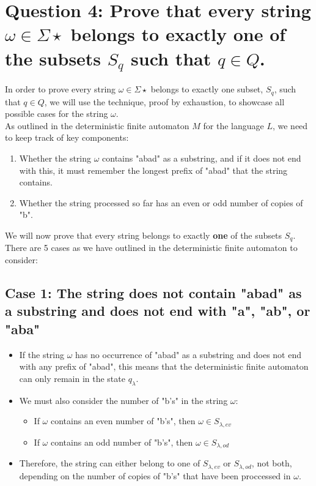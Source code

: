 \documentclass{article}
\begin{document}
\newpage

\section*{Question 4: Prove that every string $\omega \in \Sigma \star$ belongs to exactly one of the subsets $S_q$ such that $q \in Q$.}

In order to prove every string $\omega \in \Sigma \star$ belongs to exactly one subset, $S_q$, such that $q \in Q$, we will use the technique, proof by exhaustion, to showcase all possible
cases for the string $\omega$. \\
As outlined in the deterministic finite automaton $M$ for the language $L$, we need to keep track of key components:
\begin{enumerate}
    \item Whether the string $\omega$ contains "abad" as a substring, and if it does not end with this, it must remember the longest prefix of "abad" that the string contains.
    \item Whether the string processed so far has an even or odd number of copies of "b".
\end{enumerate}
We will now prove that every string belongs to exactly \textbf{one} of the subsets $S_q$. There are 5 cases as we have outlined in the deterministic finite automaton to consider:

\subsection*{Case 1: The string does not contain "abad" as a substring and does not end with "a", "ab", or "aba"}
\begin{itemize}
    \item If the string $\omega$ has no occurrence of "abad" as a substring and does not end with any prefix of "abad", this means that the deterministic finite automaton can only remain in the state $q_\lambda$.
    \item We must also consider the number of "b's" in the string $\omega$:
    \begin{itemize}
        \item If $\omega$ contains an even number of "b's", then $\omega \in S_{\lambda,ev}$
        \item If $\omega$ contains an odd number of "b's", then $\omega \in S_{\lambda,od}$ 
    \end{itemize}
    \item Therefore, the string can either belong to one of $S_{\lambda,ev}$ or $S_{\lambda,od}$, not both, depending on the number of copies of "b's" that have been proccessed in $\omega$.
\end{itemize}
\end{document}

